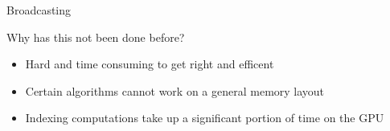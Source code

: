 \documentclass[utf8x,xcolor=pdftex,dvipsnames,table]{beamer}
\begin{document}
\begin{frame}{Broadcasting}
\begin{center}
\end{center}
\end{frame}

\begin{frame}{Why has this not been done before?}
\begin{itemize}
\item Hard and time consuming to get right and efficent
\item Certain algorithms cannot work on a general memory layout
\item Indexing computations take up a significant portion of time on the GPU
\end{itemize}
\end{frame}
\end{document}
